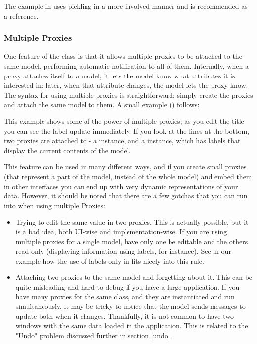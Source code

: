 \documentclass[a4paper]{howto}
\begin{document}
The  example in  uses pickling in a
more involved manner and is recommended as a reference.

\subsubsection{Multiple Proxies}
\label{multipleproxies}

One feature of the  class is that it allows multiple
proxies to be attached to the same model, performing automatic
notification to all of them. Internally, when a proxy attaches itself to
a model, it lets the model know what attributes it is interested in;
later, when that attribute changes, the model lets the proxy know.  The
syntax for using multiple proxies is straightforward; simply create the
proxies and attach the same model to them. A small example
() follows:



This example shows some of the power of multiple proxies; as you edit
the title you can see the label update immediately. If you look at the
lines at the bottom, two proxies are attached to  - a
 instance, and a  instance, which has
labels that display the current contents of the model.

This feature can be used in many different ways, and if you create small
proxies (that represent a part of the model, instead of the whole model)
and embed them in other interfaces you can end up with very dynamic
representations of your data. However, it should be noted that there are
a few gotchas that you can run into when using multiple Proxies:

\begin{itemize}
\item Trying to edit the same value in two proxies. This is actually
possible, but it is a bad idea, both UI-wise and implementation-wise. If
you are using multiple proxies for a single model, have only one be
editable and the others read-only (displaying information using labels,
for instance). See in our example how the use of labels only in
 fits nicely into this rule.

\item Attaching two proxies to the same model and forgetting about it.
This can be quite misleading and hard to debug if you have a large
application. If you have many proxies for the same class, and they are
instantiated and run simultaneously, it may be tricky to notice that the
model sends messages to update both when it changes. Thankfully, it is
not common to have two windows with the same data loaded in the
application. This is related to the "Undo" problem discussed further in
section \ref{undo}.
\end{itemize}
\end{document}
